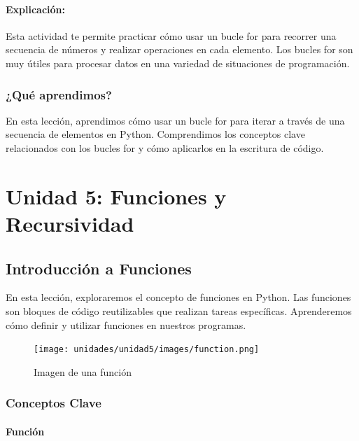 \documentclass[
  a4paper,
  DIV=11,
  numbers=noendperiod,
  onepage,
  openany]{scrreprt}
\begin{document}
\subsection{Explicación:}\label{explicaciuxf3n-31}

Esta actividad te permite practicar cómo usar un bucle for para recorrer
una secuencia de números y realizar operaciones en cada elemento. Los
bucles for son muy útiles para procesar datos en una variedad de
situaciones de programación.

\section{¿Qué aprendimos?}\label{quuxe9-aprendimos-10}

En esta lección, aprendimos cómo usar un bucle for para iterar a través
de una secuencia de elementos en Python. Comprendimos los conceptos
clave relacionados con los bucles for y cómo aplicarlos en la escritura
de código.

\part{Unidad 5: Funciones y Recursividad}

\chapter{Introducción a Funciones}\label{introducciuxf3n-a-funciones}

En esta lección, exploraremos el concepto de funciones en Python. Las
funciones son bloques de código reutilizables que realizan tareas
específicas. Aprenderemos cómo definir y utilizar funciones en nuestros
programas.

\begin{figure}

{\centering \texttt{[image: unidades/unidad5/images/function.png]}

}

\caption{Imagen de una función}

\end{figure}

\section{Conceptos Clave}\label{conceptos-clave-20}

\subsection{Función}\label{funciuxf3n}
\end{document}
